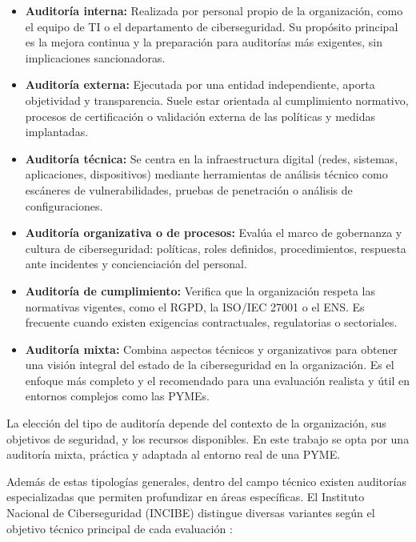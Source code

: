 \documentclass[a4paper, 11pt]{article}
\begin{document}
\begin{itemize}
    \item \textbf{Auditoría interna:} Realizada por personal propio de la organización, como el equipo de TI o el departamento de ciberseguridad. Su propósito principal es la mejora continua y la preparación para auditorías más exigentes, sin implicaciones sancionadoras.

    \item \textbf{Auditoría externa:} Ejecutada por una entidad independiente, aporta objetividad y transparencia. Suele estar orientada al cumplimiento normativo, procesos de certificación o validación externa de las políticas y medidas implantadas.

    \item \textbf{Auditoría técnica:} Se centra en la infraestructura digital (redes, sistemas, aplicaciones, dispositivos) mediante herramientas de análisis técnico como escáneres de vulnerabilidades, pruebas de penetración o análisis de configuraciones.

    \item \textbf{Auditoría organizativa o de procesos:} Evalúa el marco de gobernanza y cultura de ciberseguridad: políticas, roles definidos, procedimientos, respuesta ante incidentes y concienciación del personal.

    \item \textbf{Auditoría de cumplimiento:} Verifica que la organización respeta las normativas vigentes, como el RGPD, la ISO/IEC 27001 o el ENS. Es frecuente cuando existen exigencias contractuales, regulatorias o sectoriales.

    \item \textbf{Auditoría mixta:} Combina aspectos técnicos y organizativos para obtener una visión integral del estado de la ciberseguridad en la organización. Es el enfoque más completo y el recomendado para una evaluación realista y útil en entornos complejos como las PYMEs.
\end{itemize}

La elección del tipo de auditoría depende del contexto de la organización, sus objetivos de seguridad, y los recursos disponibles. En este trabajo se opta por una auditoría mixta, práctica y adaptada al entorno real de una PYME.

Además de estas tipologías generales, dentro del campo técnico existen auditorías especializadas que permiten profundizar en áreas específicas. El Instituto Nacional de Ciberseguridad (INCIBE) distingue diversas variantes según el objetivo técnico principal de cada evaluación \cite{incibeAuditoria}:
\end{document}
